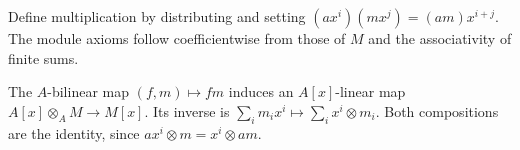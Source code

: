 Define multiplication by distributing and setting $(ax^i)(mx^j)=(am)x^{i+j}$. The module axioms follow coefficientwise from those of $M$ and the associativity of finite sums.

The $A$-bilinear map $(f,m)\mapsto fm$ induces an $A[x]$-linear map $A[x]\otimes_A M\to M[x]$. Its inverse is $\sum_i m_ix^i\mapsto\sum_i x^i\otimes m_i$. Both compositions are the identity, since $ax^i\otimes m=x^i\otimes am$.
